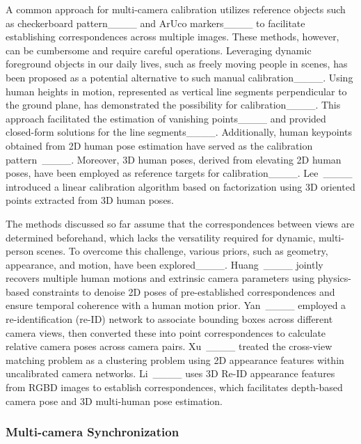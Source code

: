 A common approach for multi-camera calibration utilizes reference objects such as checkerboard pattern____ and ArUco markers____ to facilitate establishing correspondences across multiple images. These methods, however, can be cumbersome and require careful operations. Leveraging dynamic foreground objects in our daily lives, such as freely moving people in scenes, has been proposed as a potential alternative to such manual calibration____. Using human heights in motion, represented as vertical line segments perpendicular to the ground plane, has demonstrated the possibility for calibration____. This approach facilitated the estimation of vanishing points____ and provided closed-form solutions for the line segments____. Additionally, human keypoints obtained from 2D human pose estimation have served as the calibration pattern~\etal____. Moreover, 3D human poses, derived from elevating 2D human poses, have been employed as reference targets for calibration____. Lee~\etal____ introduced a linear calibration algorithm based on factorization using 3D oriented points extracted from 3D human poses.


The methods discussed so far assume that the correspondences between views are determined beforehand, which lacks the versatility required for dynamic, multi-person scenes. To overcome this challenge, various priors, such as geometry, appearance, and motion, have been explored____. Huang~\etal____ jointly recovers multiple human motions and extrinsic camera parameters using physics-based constraints to denoise 2D poses of pre-established correspondences and ensure temporal coherence with a human motion prior. Yan~\etal____ employed a re-identification (re-ID) network to associate bounding boxes across different camera views, then converted these into point correspondences to calculate relative camera poses across camera pairs. Xu~\etal____ treated the cross-view matching problem as a clustering problem using 2D appearance features within uncalibrated camera networks. Li~\etal____ uses 3D Re-ID appearance features from RGBD images to establish correspondences, which facilitates depth-based camera pose and 3D multi-human pose estimation. 

\subsubsection{Multi-camera Synchronization}

